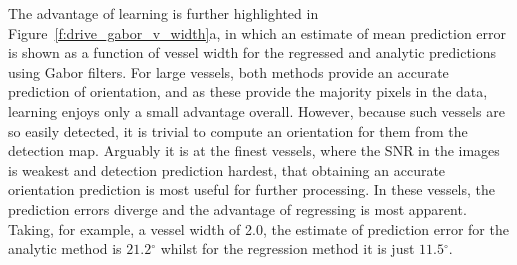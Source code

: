 \documentclass{IEEEtran}
\newcommand{\fref}[1]{Figure~\ref{#1}}
\def\deg{\ensuremath{^\circ}}
\begin{document}
The advantage of learning is further highlighted in \fref{f:drive_gabor_v_width}a, in which an estimate of mean prediction error is shown as a function of vessel width for the regressed and analytic predictions using Gabor filters. For large vessels, both methods provide an accurate prediction of orientation, and as these provide the majority pixels in the data, learning enjoys only a small advantage overall. However, because such vessels are so easily detected, it is trivial to compute an orientation for them from the detection map. Arguably it is at the finest vessels, where the SNR in the images is weakest and detection prediction hardest, that obtaining an accurate orientation prediction is most useful for further processing. In these vessels, the prediction errors diverge and the advantage of regressing is most apparent. Taking, for example, a vessel width of 2.0, the estimate of prediction error for the analytic method is $21.2\deg$ whilst for the regression method it is just $11.5\deg$.
\end{document}
